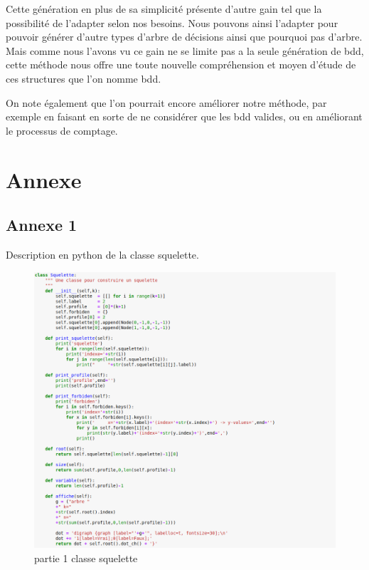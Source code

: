 \documentclass[french]{article}
\begin{document}
Cette génération en plus de sa simplicité présente d'autre gain tel que la possibilité de l'adapter selon nos besoins. Nous pouvons ainsi l'adapter pour pouvoir générer d'autre types d'arbre de décisions ainsi que pourquoi pas d'arbre. 
Mais comme nous l'avons vu ce gain ne se limite pas a la seule génération de bdd, cette méthode nous offre une toute nouvelle compréhension et moyen d'étude de ces structures que l'on nomme bdd.

On note également que l'on pourrait encore améliorer notre méthode, par exemple en faisant en sorte de ne considérer que les bdd valides, ou en améliorant le processus de comptage. 
\newpage
\section{Annexe}
\subsection{Annexe 1}
\label{Annexe_1}
Description en python de la classe squelette. 

\begin{figure}[H]
    \centering
    \includegraphics[scale=0.4]{part1_squelette.png}
    \caption{partie 1 classe squelette}
    \label{fig:squelette1}
\end{figure}
\end{document}
